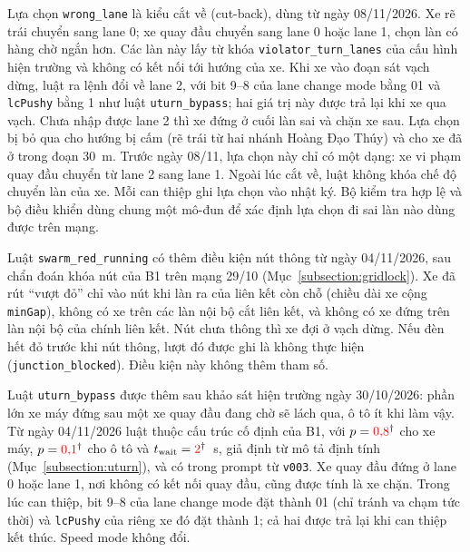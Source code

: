 \documentclass[../main.tex]{subfiles}
\begin{document}
Lựa chọn \texttt{wrong\_lane} là kiểu cắt về (cut-back), dùng từ ngày 08/11/2026. Xe rẽ trái chuyển sang lane 0; xe quay đầu chuyển sang lane 0 hoặc lane 1, chọn làn có hàng chờ ngắn hơn. Các làn này lấy từ khóa \texttt{violator\_turn\_lanes} của cấu hình hiện trường và không có kết nối tới hướng của xe. Khi xe vào đoạn  sát vạch dừng, luật ra lệnh đổi về lane 2, với bit 9--8 của lane change mode bằng 01 và \texttt{lcPushy} bằng 1 như luật \texttt{uturn\_bypass}; hai giá trị này được trả lại khi xe qua vạch. Chưa nhập được lane 2 thì xe đứng ở cuối làn sai và chặn xe sau. Lựa chọn bị bỏ qua cho hướng bị cấm (rẽ trái từ hai nhánh Hoàng Đạo Thúy) và cho xe đã ở trong đoạn 30~m. Trước ngày 08/11, lựa chọn này chỉ có một dạng: xe vi phạm quay đầu chuyển từ lane 2 sang lane 1. Ngoài lúc cắt về, luật không khóa chế độ chuyển làn của xe. Mỗi can thiệp ghi lựa chọn vào nhật ký. Bộ kiểm tra hợp lệ và bộ điều khiển dùng chung một mô-đun để xác định lựa chọn đi sai làn nào dùng được trên mạng.

Luật \texttt{swarm\_red\_running} có thêm điều kiện nút thông từ ngày 04/11/2026, sau chẩn đoán khóa nút của B1 trên mạng 29/10 (Mục~\ref{subsection:gridlock}). Xe đã rút ``vượt đỏ'' chỉ vào nút khi làn ra của liên kết còn chỗ (chiều dài xe cộng \texttt{minGap}), không có xe trên các làn nội bộ cắt liên kết, và không có xe đứng trên làn nội bộ của chính liên kết. Nút chưa thông thì xe đợi ở vạch dừng. Nếu đèn hết đỏ trước khi nút thông, lượt đó được ghi là không thực hiện (\texttt{junction\_blocked}). Điều kiện này không thêm tham số.

Luật \texttt{uturn\_bypass} được thêm sau khảo sát hiện trường ngày 30/10/2026: phần lớn xe máy đứng sau một xe quay đầu đang chờ sẽ lách qua, ô tô ít khi làm vậy. Từ ngày 04/11/2026 luật thuộc cấu trúc cố định của B1, với $p = \textcolor{red}{0{,}8}^{\dagger}$ cho xe máy, $p = \textcolor{red}{0{,}1}^{\dagger}$ cho ô tô và $t_{\text{wait}} = \textcolor{red}{2}^{\dagger}$~s, giả định từ mô tả định tính (Mục~\ref{subsection:uturn}), và có trong prompt từ \texttt{v003}. Xe quay đầu đứng ở lane 0 hoặc lane 1, nơi không có kết nối quay đầu, cũng được tính là xe chặn. Trong lúc can thiệp, bit 9--8 của lane change mode đặt thành 01 (chỉ tránh va chạm tức thời) và \texttt{lcPushy} của riêng xe đó đặt thành 1; cả hai được trả lại khi can thiệp kết thúc. Speed mode không đổi.
\end{document}
